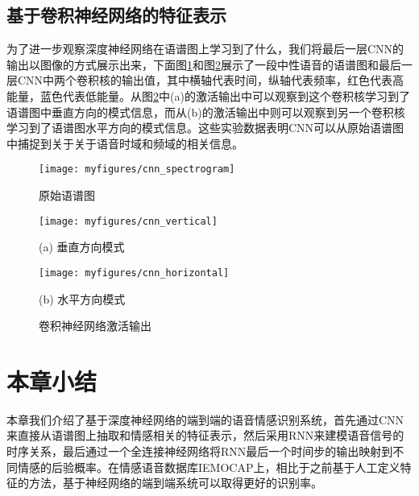 \subsection{基于卷积神经网络的特征表示}
\label{ssec:end2end_cnn_feature}

为了进一步观察深度神经网络在语谱图上学习到了什么，我们将最后一层CNN的输出以图像的方式展示出来，下面图\ref{fig:cnn_spectrogram}和图\ref{fig:cnn_activation}展示了一段中性语音的语谱图和最后一层CNN中两个卷积核的输出值，其中横轴代表时间，纵轴代表频率，红色代表高能量，蓝色代表低能量。从图\ref{fig:cnn_activation}中(a)的激活输出中可以观察到这个卷积核学习到了语谱图中垂直方向的模式信息，而从(b)的激活输出中则可以观察到另一个卷积核学习到了语谱图水平方向的模式信息。这些实验数据表明CNN可以从原始语谱图中捕捉到关于关于语音时域和频域的相关信息。

\begin{figure}[htb] %
    \centering
    \texttt{[image: myfigures/cnn\_spectrogram]}
    \caption{原始语谱图}
    \label{fig:cnn_spectrogram}
\end{figure}

\begin{figure}[htb]
\begin{minipage}{0.48\textwidth}
    \centering
    \texttt{[image: myfigures/cnn\_vertical]}
    \centerline{(a) 垂直方向模式}\medskip
\end{minipage}\hfill
\begin{minipage}{0.48\textwidth}
    \centering
    \texttt{[image: myfigures/cnn\_horizontal]}
    \centerline{(b) 水平方向模式}\medskip
\end{minipage}
\caption{卷积神经网络激活输出}
\label{fig:cnn_activation}
\end{figure}

\section{本章小结}
\label{sec:end2end_summary}

本章我们介绍了基于深度神经网络的端到端的语音情感识别系统，首先通过CNN来直接从语谱图上抽取和情感相关的特征表示，然后采用RNN来建模语音信号的时序关系，最后通过一个全连接神经网络将RNN最后一个时间步的输出映射到不同情感的后验概率。在情感语音数据库IEMOCAP上，相比于之前基于人工定义特征的方法，基于神经网络的端到端系统可以取得更好的识别率。